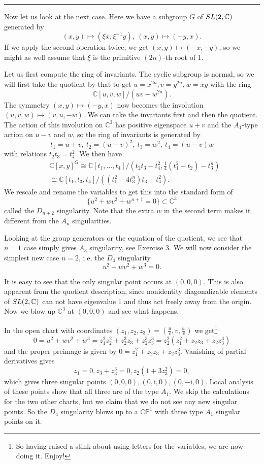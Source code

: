 \documentclass[11pt]{article}
\numberwithin{equation}{section}
\numberwithin{footnote}{section}
\newcommand{\blue}{\color{blue}}
\newcommand{\ii}{{\mathrm i}}
\renewcommand{\P}{{\mathbb P}}
\newcommand{\C}{{\mathbb C}}
\begin{document}
\smallskip
{\blue \hrule}
Now let us look at the next case. Here we have a subgroup $G$ of ${\rm SL}(2,\C)$ generated by
\begin{equation}\label{Dn}
(x,y)\mapsto (\xi x, \xi^{-1} y),~(x,y)\mapsto (-y,x).
\end{equation}
If we apply the second operation twice, we get $(x,y)\mapsto (-x,-y)$, so we might as well assume that $\xi$ is the primitive $(2n)$-th root of $1$. 

\smallskip
Let us first compute the ring of invariants. The cyclic subgroup is normal, so we will first take the quotient by that to get
$u=x^{2n},v= y^{2n}, w= xy$ with the ring
$$
\C[u,v,w]/(uv-w^{2n}).
$$
The symmetry $(x,y)\mapsto (-y,x)$ now becomes the involution $(u,v,w) \mapsto (v,u,-w)$. We can take the invariants first and then the quotient. The action of this involution on $\C^3$ has positive eigenspace $u+v$ and the $A_1$-type action on $u-v$ and $w$, so the ring of invariants is generated by
$$
t_1 = u+v,~t_2= (u-v)^2,~t_3 =w^2,~t_4=(u-v)w
$$
with relations $t_2 t_3 = t_4^2$. We then have 
\begin{align*}
&\C[x,y]^G \cong \C[t_1,\ldots,t_4]/(t_2 t_3 - t_4^2, \frac 14( t_1^2 - t_2)- t_3^n)\\
&\cong  \C[t_1,t_3,t_4]/((t_1^2 -4t_3^n) t_3 - t_4^2).
\end{align*}
We rescale and rename the variables to get this into the standard form of 
$$
\{u^2 + wv^2 + w^{n+1} = 0\} \subset \C^3
$$
called the $D_{n+2}$ singularity. Note that the extra $w$ in the second term makes it different from the $A_n$ singularities.

\smallskip
Looking at the group generators or the equation of the quotient, we see that $n=1$ case simply gives $A_3$ singularity, see Exercise 3.
We will now consider the simplest new case $n=2$, i.e. the $D_4$ singularity
$$
u^2 + wv^2 + w^3=0.
$$

\smallskip
It is easy to see that the only singular point occurs at $(0,0,0)$. This is also apparent from the quotient description, since nonidentity diagonalizable elements of ${\rm SL}(2,\C)$ can not have eigenvalue $1$ and thus act freely away from the origin.
Now we blow up $\C^3$ at $(0,0,0)$ and see what happens. 

\smallskip
In the open chart with coordinates $(z_1,z_2,z_3) =(\frac uv , v, \frac wv)$ we get\footnote{ So having raised a stink about using letters for the variables, we are now doing it. Enjoy!}
$$
0 = u^2 + w v^2 + w^3 = z_1^2 z_2^2  + z_2^3  z_3 + z_2^3 z_3^3 = z_2^2(z_1^2 + z_2 z_3 + z_2 z_3^3)
$$
and the proper preimage is given by $0=z_1^2 + z_2 z_3 + z_2 z_3^3$. Vanishing of partial derivatives gives
$$
z_1 = 0, z_3 +z_3^3 =0, z_2 (1 + 3z_3^2) = 0,
$$
which gives three singular points $(0,0,0),(0,\ii,0),(0,-\ii,0)$. Local analysis of these points show that all three are of the type $A_1$.
We skip the calculations for the two other charts, but we claim that we do not see any new singular points.  
So the $D_4$ singularity blows up to a $\C\P^1$ with three type $A_1$ singular  points on it.
\end{document}

